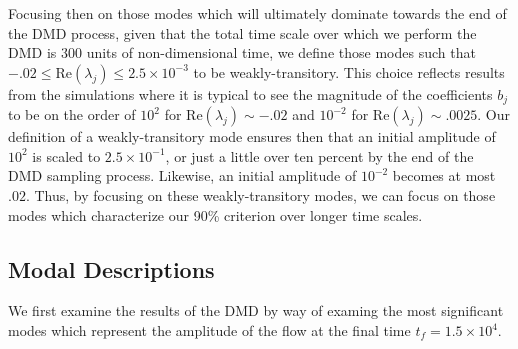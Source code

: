 \documentclass[aps,prl,preprint,groupedaddress]{revtex4-1}
\begin{document}
Focusing then on those modes which will ultimately dominate towards the end of the DMD process, given that the total time scale over which we perform the DMD is $300$ units of non-dimensional time, we define those modes such that $-.02\leq \mbox{Re}\left(\lambda_{j}\right)\leq 2.5\times 10^{-3}$ to be weakly-transitory.  This choice reflects results from the simulations where it is typical to see the magnitude of the coefficients $b_{j}$ to be on the order of $10^{2}$ for $\mbox{Re}\left(\lambda_{j}\right)\sim -.02$ and $10^{-2}$ for $\mbox{Re}\left(\lambda_{j}\right)\sim .0025$.  Our definition of a weakly-transitory mode ensures then that an initial amplitude of $10^{2}$ is scaled to $2.5\times 10^{-1}$, or just a little over ten percent by the end of the DMD sampling process.  Likewise, an initial amplitude of $10^{-2}$ becomes at most $.02$.  Thus, by focusing on these weakly-transitory modes, we can focus on those modes which characterize our 90\% criterion over longer time scales.  
\subsection*{Modal Descriptions}
We first examine the results of the DMD by way of examing the most significant modes which represent the amplitude of the flow at the final time $t_{f}=1.5\times10^{4}$.  
\end{document}
